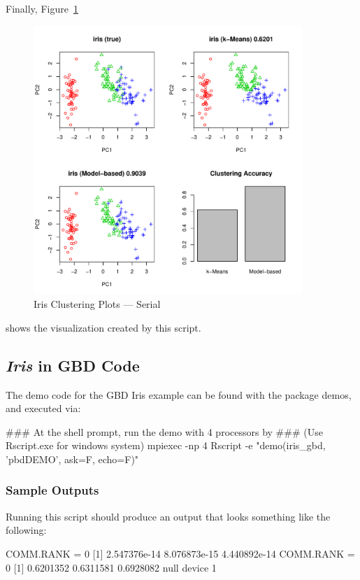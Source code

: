 Finally, Figure~\ref{fig:iris_cluster_serial}
\begin{figure}[h!bt]
  \centering
  \includegraphics[width=4in]{pbdDEMO-include/pics/serial_plot.pdf}
  \caption{Iris Clustering Plots --- Serial}
  \label{fig:iris_cluster_serial}
\end{figure}
shows the visualization created by this script.








\subsection{{\it Iris} in GBD Code}

The demo code for the GBD Iris example can be found with the package
demos, and executed via:
\begin{Command}
### At the shell prompt, run the demo with 4 processors by
### (Use Rscript.exe for windows system)
mpiexec -np 4 Rscript -e "demo(iris_gbd, 'pbdDEMO', ask=F, echo=F)"
\end{Command}

\subsubsection{Sample Outputs}
Running this script should produce an output that looks something like the following:
\begin{Output}
COMM.RANK = 0
[1] 2.547376e-14 8.076873e-15 4.440892e-14
COMM.RANK = 0
[1] 0.6201352 0.6311581 0.6928082
null device 
          1 
\end{Output}

